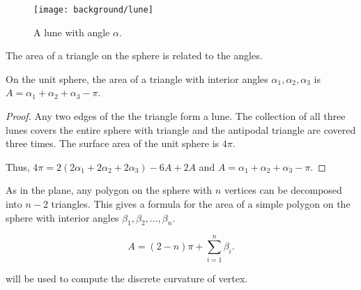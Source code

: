 \begin{figure}[htb]
\centering
\texttt{[image: background/lune]}
\caption{A lune with angle $\alpha$.}
\label{fig:lune}
\end{figure}

The area of a triangle on the sphere is related to the angles.

\begin{lemma}\label{lem:spherical-triangle}
On the unit sphere, the area of a triangle with interior angles $\alpha_1, \alpha_2, \alpha_3$
is $A=\alpha_1+\alpha_2+\alpha_3-\pi$.
\end{lemma}

\begin{proof}
Any two edges of the the triangle form a lune. The collection of 
all three lunes covers the entire sphere with triangle and the antipodal triangle
are covered three times. The surface area of the unit sphere is $4\pi$.

Thus, $4\pi=2(2\alpha_1+2\alpha_2+2\alpha_3)-6A+2A$
and $A=\alpha_1+\alpha_2+\alpha_3-\pi$.
\end{proof}

As in the plane, any polygon on the sphere with $n$ vertices can be decomposed
into $n-2$ triangles. This gives a formula for the area of a simple polygon
on the sphere with interior angles $\beta_1,\beta_2,\ldots, \beta_n$.

\begin{equation} \label{eqn:sphere-area}
A=(2-n)\pi +\sum_{i=1}^n \beta_i.
\end{equation}

 will be used to compute
the discrete curvature of vertex.

